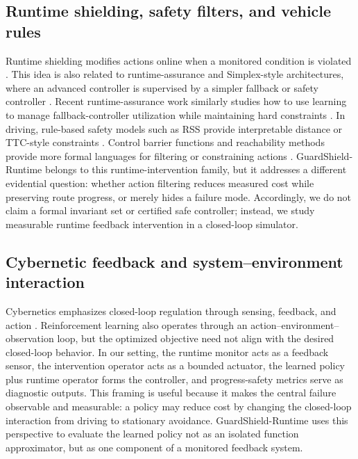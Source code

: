 \documentclass[pdflatex,sn-mathphys-ay]{sn-jnl}
\begin{document}
\subsection{Runtime shielding, safety filters, and vehicle rules}
Runtime shielding modifies actions online when a monitored condition is violated \citep{alshiekh2018shielding,saunders2018trial}. This idea is also related to runtime-assurance and Simplex-style architectures, where an advanced controller is supervised by a simpler fallback or safety controller \citep{seto1998simplex}. Recent runtime-assurance work similarly studies how to use learning to manage fallback-controller utilization while maintaining hard constraints \citep{miller2024optimal}. In driving, rule-based safety models such as RSS provide interpretable distance or TTC-style constraints \citep{shalev2017rss}. Control barrier functions and reachability methods provide more formal languages for filtering or constraining actions \citep{ames2019control,fisac2019bridging}. GuardShield-Runtime belongs to this runtime-intervention family, but it addresses a different evidential question: whether action filtering reduces measured cost while preserving route progress, or merely hides a failure mode. Accordingly, we do not claim a formal invariant set or certified safe controller; instead, we study measurable runtime feedback intervention in a closed-loop simulator.

\subsection{Cybernetic feedback and system--environment interaction}
Cybernetics emphasizes closed-loop regulation through sensing, feedback, and action \citep{wiener1948cybernetics,astrom2008feedback}. Reinforcement learning also operates through an action--environment--observation loop, but the optimized objective need not align with the desired closed-loop behavior. In our setting, the runtime monitor acts as a feedback sensor, the intervention operator acts as a bounded actuator, the learned policy plus runtime operator forms the controller, and progress-safety metrics serve as diagnostic outputs. This framing is useful because it makes the central failure observable and measurable: a policy may reduce cost by changing the closed-loop interaction from driving to stationary avoidance. GuardShield-Runtime uses this perspective to evaluate the learned policy not as an isolated function approximator, but as one component of a monitored feedback system.
\end{document}
